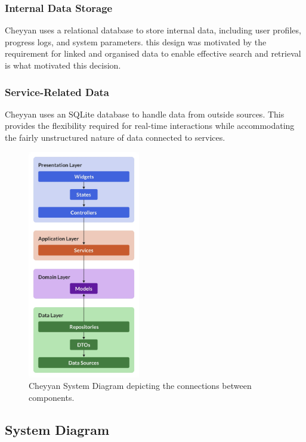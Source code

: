 \documentclass{l4proj}
\begin{document}

\subsubsection{Internal Data Storage}

Cheyyan uses a relational database to store internal data, including user profiles, progress logs, and system parameters. this design was motivated by the requirement for linked and organised data to enable effective search and retrieval is what motivated this decision.


\subsubsection{Service-Related Data}

Cheyyan uses an SQLite database to handle data from outside sources. This provides the flexibility required for real-time interactions while accommodating the fairly unstructured nature of data connected to services.

\begin{figure}[h]
    \centering
    \includegraphics[height=10cm]{images/Flutter2.png}
    \caption{Cheyyan System Diagram depicting the connections between components.}
    \label{fig:cheyyan_system_diagram}
\end{figure}

\subsection{System Diagram}
\end{document}
